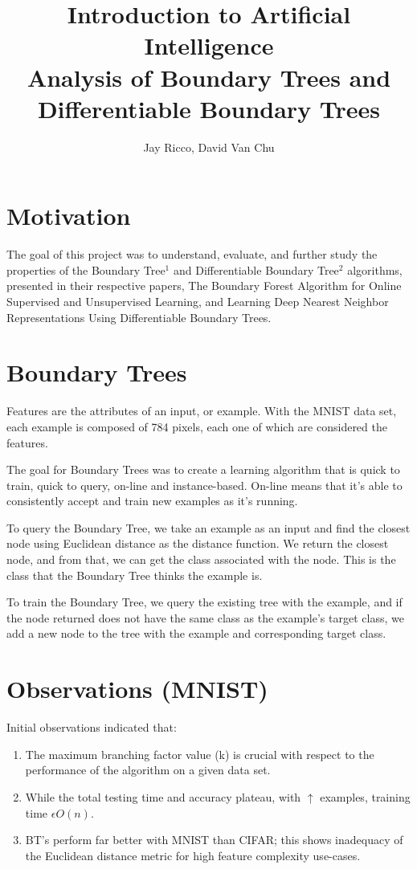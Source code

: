 \documentclass[10pt,letterpaper]{article}
\author{Jay Ricco, David Van Chu}
\title{Introduction to Artificial Intelligence\\Analysis of Boundary Trees and Differentiable Boundary Trees}
\begin{document}
	\maketitle
	\section{Motivation}
	The goal of this project was to understand, evaluate, and further study the properties of the Boundary Tree$^1$ and Differentiable Boundary Tree$^2$ algorithms, presented in their respective papers, The Boundary Forest Algorithm for Online Supervised and Unsupervised Learning, and Learning Deep Nearest Neighbor Representations Using Differentiable Boundary Trees.
	\section{Boundary Trees}
		\hspace{5mm}Features are the attributes of an input, or example. With the MNIST data set, each example is composed of 784 pixels, each one of which are considered the features.
		
		\vspace{2mm}
		The goal for Boundary Trees was to create a learning algorithm that is quick to train, quick to query, on-line and instance-based. On-line means that it's able to consistently accept and train new examples as it's running.
		
		\vspace{2mm}
		To query the Boundary Tree, we take an example as an input and find the closest node using Euclidean distance as the distance function. We return the closest node, and from that, we can get the class associated with the node. This is the class that the Boundary Tree thinks the example is.
		
		\vspace{2mm}
		To train the Boundary Tree, we query the existing tree with the example, and if the node returned does not have the same class as the example's target class, we add a new node to the tree with the example and corresponding target class.

	\section{Observations (MNIST)}
		Initial observations indicated that:
		\begin{enumerate}
			\item The maximum branching factor value (k) is crucial with respect to the performance of the algorithm on a given data set.
			\item While the total testing time and accuracy plateau, with $\uparrow$ examples, training time $\epsilon O(n).$
			\item BT's perform far better with MNIST than CIFAR; this shows inadequacy of the Euclidean distance metric for high feature complexity use-cases.
		\end{enumerate}
		
\end{document}
